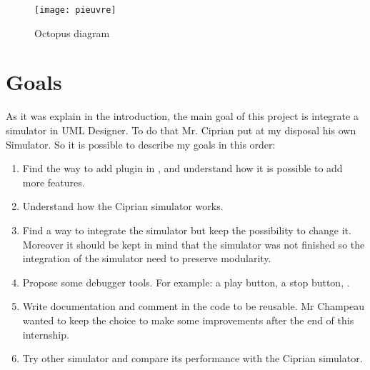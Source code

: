 \begin{figure}[!h]
  \centering
  \texttt{[image: pieuvre]}
  \caption{Octopus diagram}
  \label{fig:octopus}
\end{figure}

\newpage
\section{Goals}

As it was explain in the introduction, the main goal of this project is integrate a simulator in UML Designer. To do that Mr. Ciprian put at my disposal his own Simulator. So it is possible to describe my goals in this order:

\begin{enumerate}
\item Find the way to add plugin in \umld, and understand how it is possible to add more features.
\item Understand how the Ciprian simulator works.
\item Find a way to integrate the simulator but keep the possibility to change it. Moreover it should be kept in mind that the simulator was not finished so the integration of the simulator need to preserve modularity.
\item Propose some debugger tools. For example: a play button, a stop button, \etc.
\item Write documentation and comment in the code to be reusable. Mr Champeau wanted to keep the choice to make some improvements after the end of this internship.
\item Try other simulator and compare its performance with the Ciprian simulator.
\end{enumerate}









